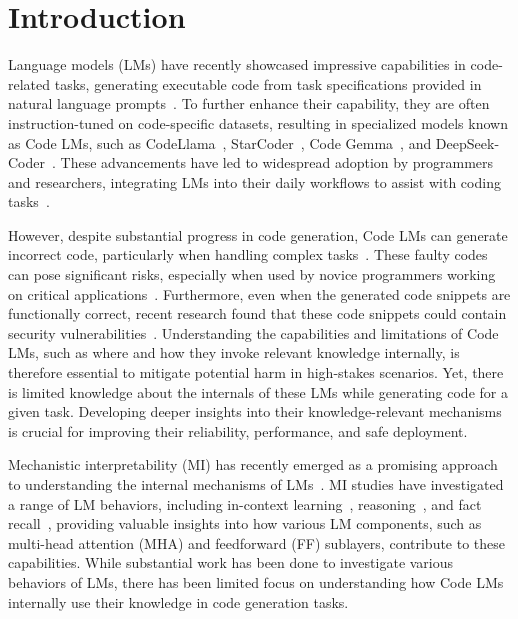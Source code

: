 \section{Introduction}

{Language models (LMs) have recently showcased impressive capabilities in code-related tasks, generating executable code from task specifications provided in natural language prompts~\cite{jiang2024survey, zan2023large}. To further enhance their capability, they are often instruction-tuned on code-specific datasets, resulting in specialized models known as Code LMs, such as CodeLlama~\cite{roziere2023code}, StarCoder~\cite{li2023starcoder}, Code Gemma~\cite{team2024codegemma}, and DeepSeek-Coder~\cite{guo2024deepseek}. These advancements have led to widespread adoption by programmers and researchers, integrating LMs into their daily workflows to assist with coding tasks~\cite{dakhel2023github}.}  

{However, despite substantial progress in code generation, Code LMs can generate incorrect code, particularly when handling complex tasks~\cite{dou2024s, tambon2024bugs}. These faulty codes can pose significant risks, especially when used by novice programmers working on critical applications~\cite{dakhel2023github}. Furthermore, even when the generated code snippets are functionally correct, recent research found that these code snippets could contain security vulnerabilities~\cite{siddiq2022securityeval, yang2024seccodeplt}. Understanding the capabilities and limitations of Code LMs, such as where and how they invoke relevant knowledge internally, is therefore essential to mitigate potential harm in high-stakes scenarios. Yet, there is limited knowledge about the internals of these LMs while generating code for a given task. Developing deeper insights into their knowledge-relevant mechanisms is crucial for improving their reliability, performance, and safe deployment.}

Mechanistic interpretability (MI) has recently emerged as a promising approach to understanding the internal mechanisms of LMs~\cite{olah2020zoom, elhage2021mathematical, rai2024investigation, bereska2024mechanistic}. MI studies have investigated a range of LM behaviors, including in-context learning~\cite{elhage2021mathematical, bansal2022rethinking, ren2024identifying}, reasoning~\cite{stolfo2023mechanistic, rai2024investigation, dutta2024think}, and fact recall~\cite{geva2023dissecting, chughtai2024summing}, providing valuable insights into how various LM components, such as multi-head attention (MHA) and feedforward (FF) sublayers, contribute to these capabilities. While substantial work has been done to investigate various behaviors of LMs, there has been limited focus on understanding how Code LMs internally use their knowledge in code generation tasks.

